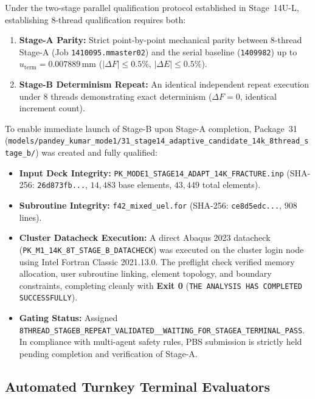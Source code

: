 Under the two-stage parallel qualification protocol established in Stage~14U-L, establishing 8-thread qualification requires both:
\begin{enumerate}
  \item \textbf{Stage-A Parity:} Strict point-by-point mechanical parity between 8-thread Stage-A (Job \texttt{1410095.mmaster02}) and the serial baseline (\texttt{1409982}) up to $u_{\mathrm{term}} = 0.007889\,\mathrm{mm}$ ($|\Delta F| \le 0.5\%$, $|\Delta E| \le 0.5\%$).
  \item \textbf{Stage-B Determinism Repeat:} An identical independent repeat execution under 8 threads demonstrating exact determinism ($\Delta F = 0$, identical increment count).
\end{enumerate}

To enable immediate launch of Stage-B upon Stage-A completion, Package~31 (\texttt{models/pandey\_kumar\_mode1/31\_stage14\_adaptive\_candidate\_14k\_8thread\_stage\_b/}) was created and fully qualified:
\begin{itemize}
  \item \textbf{Input Deck Integrity:} \texttt{PK\_MODE1\_STAGE14\_ADAPT\_14K\_FRACTURE.inp} (SHA-256: \texttt{26d873fb...}, $14{,}483$ base elements, $43{,}449$ total elements).
  \item \textbf{Subroutine Integrity:} \texttt{f42\_mixed\_uel.for} (SHA-256: \texttt{ce8d5edc...}, $908$ lines).
  \item \textbf{Cluster Datacheck Execution:} A direct Abaqus 2023 datacheck (\texttt{PK\_M1\_14K\_8T\_STAGE\_B\_DATACHECK}) was executed on the cluster login node using Intel Fortran Classic 2021.13.0. The preflight check verified memory allocation, user subroutine linking, element topology, and boundary constraints, completing cleanly with \textbf{Exit 0} (\texttt{THE ANALYSIS HAS COMPLETED SUCCESSFULLY}).
  \item \textbf{Gating Status:} Assigned \texttt{8THREAD\_STAGEB\_REPEAT\_VALIDATED\_\_WAITING\_FOR\_STAGEA\_TERMINAL\_PASS}. In compliance with multi-agent safety rules, PBS submission is strictly held pending completion and verification of Stage-A.
\end{itemize}

\subsection{Automated Turnkey Terminal Evaluators}
\label{subsec:stage14uao_evaluators}

